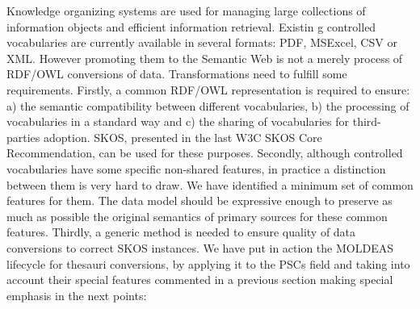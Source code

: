 Knowledge organizing systems are used for managing large collections of information objects and efficient information retrieval. Existin
g controlled vocabularies are currently available in several formats: PDF, MSExcel, CSV or XML. However promoting them 
to the Semantic Web is not a merely process of 
RDF/OWL conversions of data. Transformations need to fulfill some requirements. Firstly, a common RDF/OWL 
representation is required to ensure: a) the semantic compatibility between different vocabularies,
b) the processing of vocabularies in a standard way and c) the sharing of vocabularies for third-parties adoption. 
SKOS, presented in the last W3C SKOS Core Recommendation, can be used for these purposes. 
Secondly, although controlled vocabularies have some specific non-shared features, in practice a distinction 
between them is very hard to draw. We have identified a minimum set of common features for them. The data model 
should be expressive enough to preserve as much as possible the original semantics of primary sources for these 
common features. Thirdly, a generic method is needed to ensure quality of data conversions to correct SKOS instances. 
We have put in action the MOLDEAS lifecycle for thesauri conversions, by applying it to the PSCs field and taking into 
account their special features commented in a previous section making special emphasis in the next points:
